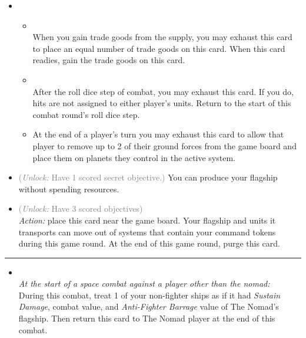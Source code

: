 \begin{multicols}{2}
\begin{itemize}
\item {}
\begin{itemize}
\item {}\\
When you gain trade goods from the supply, you may exhaust this card to place an equal number of trade goods on this card. When this card readies, gain the trade goods on this card.
\item {}\\
After the roll dice step of combat, you may exhaust this card. If you do, hits are not assigned to either player's units. Return to the start of this combat round's roll dice step.
\item {}
At the end of a player's turn you may exhaust this card to allow that player to remove up to 2 of their ground forces from the game board and place them on planets they control in the active system.
\end{itemize}
\item {} \textcolor{gray}{(\emph{Unlock:} Have 1 scored secret objective.)}
You can produce your flagship without spending resources.
\item {} \textcolor{gray}{(\emph{Unlock:} Have 3 scored objectives)}\\
\emph{Action:} place this card near the game board. Your flagship and units it transports can move out of systems that contain your command tokens during this game round. At the end of this game round, purge this card.
\end{itemize}

\vspace{-10pt}\rule{\hsize}{0.4pt}\vspace{5pt}


\begin{itemize}
\item {}\\
\emph{At the start of a space combat against a player other than the nomad:}\\
During this combat, treat 1 of your non-fighter ships as if it had \emph{Sustain Damage}, combat value, and \emph{Anti-Fighter Barrage} value of The Nomad's flagship. Then return this card to The Nomad player at the end of this combat.
\end{itemize}

\end{multicols}



